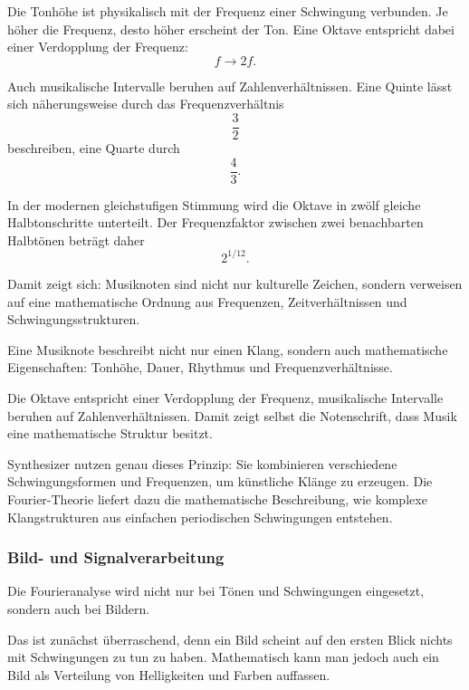 Die Tonhöhe ist physikalisch mit der Frequenz einer Schwingung verbunden.
Je höher die Frequenz,
desto höher erscheint der Ton.
Eine Oktave entspricht dabei einer Verdopplung der Frequenz:
\[
f \longrightarrow 2f.
\]

Auch musikalische Intervalle beruhen auf Zahlenverhältnissen.
Eine Quinte lässt sich näherungsweise durch das Frequenzverhältnis
\[
\frac{3}{2}
\]
beschreiben,
eine Quarte durch
\[
\frac{4}{3}.
\]

In der modernen gleichstufigen Stimmung wird die Oktave in zwölf gleiche Halbtonschritte unterteilt.
Der Frequenzfaktor zwischen zwei benachbarten Halbtönen beträgt daher
\[
2^{1/12}.
\]

Damit zeigt sich:
Musiknoten sind nicht nur kulturelle Zeichen,
sondern verweisen auf eine mathematische Ordnung aus Frequenzen,
Zeitverhältnissen und Schwingungsstrukturen.

\begin{NoteBox}
	\small
	\label{box:Musiknoten}
	Eine Musiknote beschreibt nicht nur einen Klang,
	sondern auch mathematische Eigenschaften:
	Tonhöhe, Dauer, Rhythmus und Frequenzverhältnisse.
	
	Die Oktave entspricht einer Verdopplung der Frequenz,
	musikalische Intervalle beruhen auf Zahlenverhältnissen.
	Damit zeigt selbst die Notenschrift,
	dass Musik eine mathematische Struktur besitzt.
\end{NoteBox}

Synthesizer nutzen genau dieses Prinzip:
Sie kombinieren verschiedene Schwingungsformen und Frequenzen,
um künstliche Klänge zu erzeugen.
Die Fourier-Theorie liefert dazu die mathematische Beschreibung,
wie komplexe Klangstrukturen aus einfachen periodischen Schwingungen entstehen.

\subsubsection*{Bild- und Signalverarbeitung}

Die Fourieranalyse wird nicht nur bei Tönen und Schwingungen eingesetzt,
sondern auch bei Bildern.

Das ist zunächst überraschend,
denn ein Bild scheint auf den ersten Blick nichts mit Schwingungen zu tun zu haben.
Mathematisch kann man jedoch auch ein Bild als Verteilung von Helligkeiten
und Farben auffassen.

